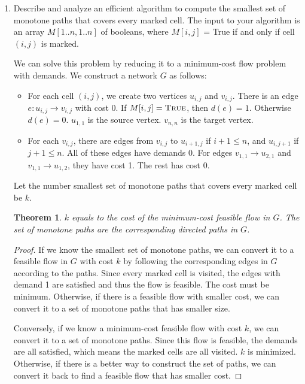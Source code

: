 \documentclass[letterpaper,11pt]{article}
\newtheorem{theorem}{Theorem}
\begin{document}
\begin{enumerate}
\begin{enumerate}
\item
Describe and analyze an efficient algorithm to compute the smallest set of
monotone paths that covers every marked cell. The input to your algorithm is an
array $M[1..n,1..n]$ of booleans, where $M[i, j]$ = True if and only if cell
$(i, j)$ is marked.

\begin{solution}
  We can solve this problem by reducing it to a minimum-cost flow problem with
  demands.
  We construct a network $G$ as follows:
  \begin{itemize}
    \item For each cell $(i,j)$, we create two vertices $u_{i,j}$ and $v_{i,j}$.
      There is an edge $e: u_{i,j} \rightarrow v_{i,j}$ with cost 0.  If
      $M[i,j]=\text{\textsc{True}}$, then $d(e)=1$. Otherwise $d(e)=0$.
      $u_{1,1}$ is the source vertex. $v_{n,n}$ is the target vertex.
    \item For each $v_{i,j}$, there are edges from $v_{i,j}$ to $u_{i+1,j}$ if
      $i+1 \leq n$, and $u_{i,j+1}$ if $j+1 \leq n$. 
      All of these edges have demands 0.
      For edges $v_{1,1} \rightarrow u_{2,1}$ and $v_{1,1} \rightarrow u_{1,2}$,
      they have cost 1. The rest has cost 0.
  \end{itemize}
  Let the number smallest set of monotone paths that covers every marked cell
  be $k$.
  \begin{theorem}
    $k$ equals to the cost of the minimum-cost feasible flow in $G$.
    The set of monotone paths are the corresponding directed paths in $G$.
  \end{theorem}
  \begin{proof}
    If we know the smallest set of monotone paths, we can convert it 
    to a feasible flow in $G$ with cost $k$ by following the corresponding
    edges in $G$ according to the paths.
    Since every marked cell is visited, the edges with demand 1 
    are satisfied and thus the flow is feasible.
    The cost must be minimum. Otherwise, if there is a feasible flow with 
    smaller cost, we can convert it to a set of monotone paths that has 
    smaller size.
    
    Conversely, if we know a minimum-cost feasible flow with cost $k$, we 
    can convert it to a set of monotone paths.
    Since this flow is feasible, the demands are all satisfied, which 
    means the marked cells are all visited.
    $k$ is minimized. Otherwise, if there is a better way to construct 
    the set of paths, we can convert it back to find a feasible flow
    that has smaller cost.
  \end{proof}


\end{solution}
\end{enumerate}
\end{enumerate}
\end{document}
